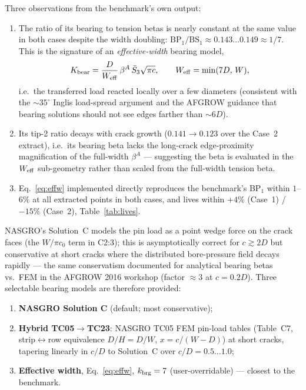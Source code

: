 \documentclass[11pt]{article}
\begin{document}
Three observations from the benchmark's own output:
\begin{enumerate}
\item The ratio of its bearing to tension betas is nearly constant at the
  same value in both cases despite the width doubling:
  $\mathrm{BP}_1/\mathrm{BS}_1 \approx 0.143\ldots0.149 \approx 1/7$.
  This is the signature of an \emph{effective-width} bearing model,
  \begin{equation}
    K_{\rm bear} = \frac{D}{W_{\rm eff}}\,\beta^A\,\bar S_3\sqrt{\pi c},
    \qquad W_{\rm eff}=\min(7D,\,W),
    \label{eq:effw}
  \end{equation}
  i.e.\ the transferred load reacted locally over a few diameters
  (consistent with the $\sim35^\circ$ Inglis load-spread argument and the
  AFGROW guidance that bearing solutions should not see edges farther than
  $\sim6D$).
\item Its tip-2 ratio decays with crack growth ($0.141\to0.123$ over the
  Case~2 extract), i.e.\ its bearing beta lacks the long-crack
  edge-proximity magnification of the full-width $\beta^A$ --- suggesting the
  beta is evaluated in the $W_{\rm eff}$ sub-geometry rather than scaled
  from the full-width tension beta.
\item Eq.~\eqref{eq:effw} implemented directly reproduces the benchmark's
  BP$_1$ within $1$--$6\%$ at all extracted points in both cases, and lives
  within $+4\%$ (Case~1) / $-15\%$ (Case~2), Table~\ref{tab:lives}.
\end{enumerate}

NASGRO's Solution~C models the pin load as a point wedge force on the crack
faces (the $W/\pi c_0$ term in C2:3); this is asymptotically correct for
$c\gtrsim 2D$ but conservative at short cracks where the distributed
bore-pressure field decays rapidly --- the same conservatism documented for
analytical bearing betas vs.\ FEM in the AFGROW 2016 workshop (factor
$\approx3$ at $c=0.2D$). Three selectable bearing models are therefore
provided:

\begin{enumerate}
\item \textbf{NASGRO Solution C} (default; most conservative);
\item \textbf{Hybrid TC05$\to$TC23}: NASGRO TC05 FEM pin-load tables
  (Table~C7, strip$\leftrightarrow$row equivalence $D/H=D/W$,
  $x=c/(W-D)$) at short cracks, tapering linearly in $c/D$ to Solution~C
  over $c/D=0.5\ldots1.0$;
\item \textbf{Effective width}, Eq.~\eqref{eq:effw}, $k_{\rm brg}=7$
  (user-overridable) --- closest to the benchmark.
\end{enumerate}
\end{document}
